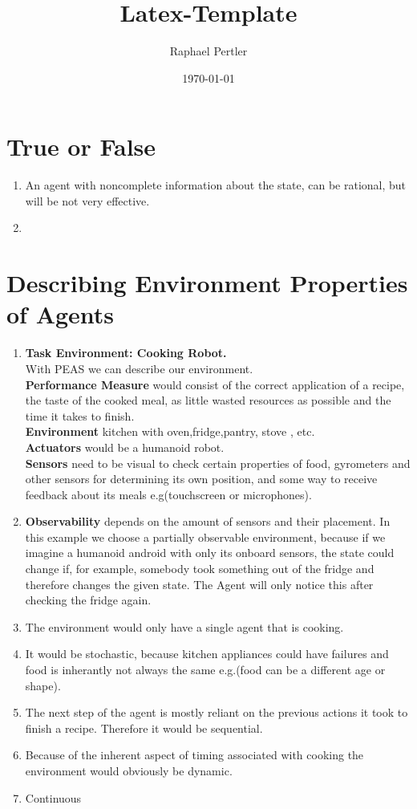 \documentclass[twocolumn]{article}
\title{\textbf{Latex-Template}}
\author{ Raphael Pertler }
\date{\today}
\begin{document}
\maketitle

\section*{True or False}
\begin{enumerate}[label= \emph{\alph*}]
  \item An agent with noncomplete information about the state, can be rational, but will be not very effective.
  \item
\end{enumerate}

\section*{Describing Environment Properties of Agents}
\begin{enumerate}[label=\emph{\alph*)}]
\item \textbf{Task Environment: Cooking Robot.} \\
  With PEAS we can describe our environment. \\
  \textbf{Performance Measure} would consist of the correct application of a recipe, the taste of the cooked meal, as little wasted resources as possible and the time it takes to finish. \\
  \textbf{Environment} kitchen with oven,fridge,pantry, stove , etc. \\
  \textbf{Actuators} would be a humanoid robot. \\
  \textbf{Sensors} need to be visual to check certain properties of food, gyrometers and other sensors for determining its own position, and some way to receive feedback about its meals e.g(touchscreen or microphones).
\item  \textbf{Observability} depends on the amount of sensors and their placement. In this example we choose a partially observable environment, because if we imagine a humanoid android with only its onboard sensors, the state could change if, for example, somebody took something out of the fridge and therefore changes the given state. The Agent will only notice this after checking the fridge again.
\item The environment would only have a single agent that is cooking.
\item It would be stochastic, because kitchen appliances could have failures and food is inherantly not always the same e.g.(food can be a different age or shape).
\item The next step of the agent is mostly reliant on the previous actions it took to finish a recipe. Therefore it would be sequential.
\item Because of the inherent aspect of timing associated with cooking the environment would obviously be dynamic.
\item Continuous

\end{enumerate}
\end{document}
